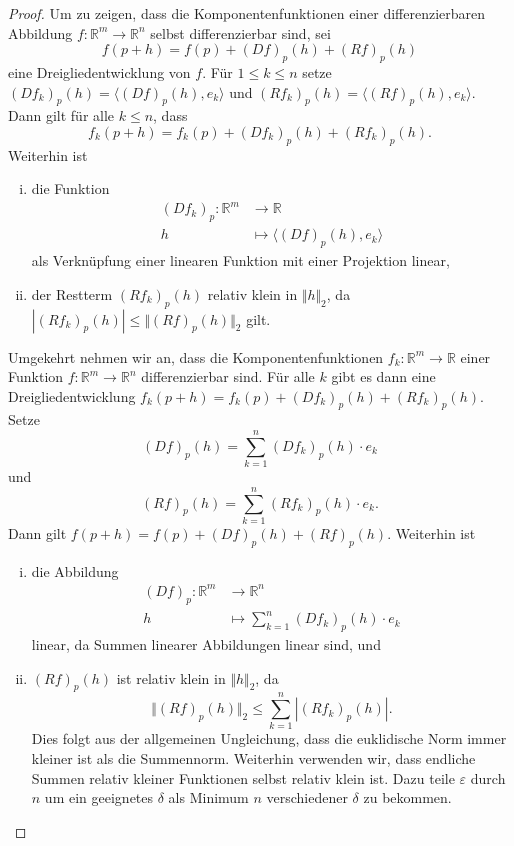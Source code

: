 \documentclass[../main.tex]{subfiles}
\begin{document}
\begin{proof}
  Um zu zeigen, dass die Komponentenfunktionen einer
  differenzierbaren Abbildung $f \colon \mathbb{R}^m \to \mathbb{R}^n$
  selbst differenzierbar sind, sei
  \[
    f(p + h) = f(p) + {(Df)}_p(h) + {(Rf)}_p(h)
  \]
  eine Dreigliedentwicklung von $f$.
  Für $1 \leq k \leq n$ 
  setze ${(Df_k)}_p(h) = \langle {(Df)}_p(h), e_k \rangle$ 
  und ${(Rf_k)}_p(h) = \langle {(Rf)}_p(h), e_k \rangle$.
  Dann gilt für alle $k \leq n$, dass
  \[
    f_k(p + h) = f_k(p) + {(Df_k)}_p(h) + {(Rf_k)}_p(h).
  \]
  Weiterhin ist
  \begin{enumerate}[(i)]
    \item die Funktion
      \begin{align*}
        {(Df_k)}_p \colon \mathbb{R}^m & \to \mathbb{R} \\
        h & \mapsto \langle {(Df)}_p(h), e_k \rangle
      \end{align*}
      als Verknüpfung einer linearen Funktion mit einer Projektion
      linear,
    \item der Restterm ${(Rf_k)}_p(h)$ relativ klein
      in $\Vert h \Vert_2$, da 
      \(
        |{(Rf_k)}_p(h)| \leq \Vert {(Rf)}_p(h) \Vert_2
      \)
      gilt.
  \end{enumerate}

  Umgekehrt nehmen wir an, dass die Komponentenfunktionen
  $f_k \colon \mathbb{R}^m \to \mathbb{R}$
  einer Funktion $f \colon \mathbb{R}^m \to \mathbb{R}^n$ 
  differenzierbar sind.
  Für alle $k$ gibt es dann eine Dreigliedentwicklung
  \(
    f_k(p + h) = f_k(p) + {(Df_k)}_p(h) + {(Rf_k)}_p(h).
  \)
  Setze
  \[
    {(Df)}_p(h) = \sum_{k=1}^{n} {(Df_k)}_p(h) \cdot e_k
  \]
  und
  \[
    {(Rf)}_p(h) = \sum_{k=1}^{n} {(Rf_k)}_p(h) \cdot e_k.
  \]
  Dann gilt
  \(
    f(p + h) = f(p) + {(Df)}_p(h) + {(Rf)}_p(h).
  \)
  Weiterhin ist
  \begin{enumerate}[(i)]
    \item die Abbildung
      \begin{align*}
        {(Df)}_p \colon \mathbb{R}^m & \to \mathbb{R}^n \\
        h & \mapsto \sum_{k=1}^{n} {(Df_k)}_p(h) \cdot e_k
      \end{align*}
      linear, da Summen linearer Abbildungen linear sind, und
    \item ${(Rf)}_p(h)$ ist relativ klein in $\Vert h \Vert_2$,
      da
      \[
        \Vert {(Rf)}_p(h) \Vert_2 \leq \sum_{k=1}^{n} |{(Rf_k)}_p(h)|.
      \]
      Dies folgt aus der allgemeinen Ungleichung, dass
      die euklidische Norm immer kleiner ist als die Summennorm.
      Weiterhin verwenden wir, dass endliche Summen
      relativ kleiner Funktionen selbst relativ klein ist.
      Dazu teile $\varepsilon$ durch $n$ um ein geeignetes
      $\delta$ als Minimum $n$ verschiedener $\delta$ zu bekommen.
      \qedhere
  \end{enumerate}
\end{proof}
\end{document}

